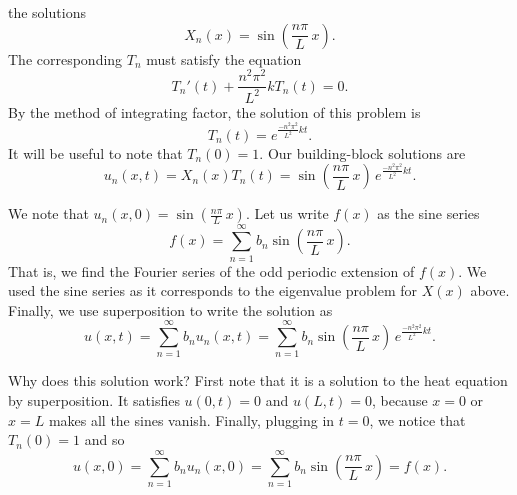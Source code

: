 the solutions
\begin{equation*}
X_n (x) = \sin \left(\frac{n \pi}{L} \, x \right) .
\end{equation*}
The corresponding $T_n$ must satisfy the equation
\begin{equation*}
T_n'(t) + \frac{n^2 \pi^2}{L^2} k T_n(t) = 0 .
\end{equation*}
By the method of integrating factor, the solution of this problem is
\begin{equation*}
T_n(t) = e^{\frac{-n^2 \pi^2}{L^2} k t} .
\end{equation*}
It will be useful to note that $T_n(0) = 1$.
Our building-block solutions are
\begin{equation*}
u_n(x,t) = X_n(x)T_n(t) =
\sin \left( \frac{n \pi}{L} \, x \right)
\, e^{\frac{-n^2 \pi^2}{L^2} k t} .
\end{equation*}

We note that $u_n(x,0) = \sin \left( \frac{n \pi}{L} \, x \right)$.  Let us
write $f(x)$ as the sine series
\begin{equation*}
f(x) = \sum_{n=1}^\infty b_n \sin \left(\frac{n \pi}{L} \, x \right) .
\end{equation*}
That is, we find the Fourier series of the odd periodic extension of $f(x)$.
We used the sine series as it corresponds to the eigenvalue problem for
$X(x)$ above.
Finally, we use superposition to write the solution as
\begin{equation*}
\boxed{~~
u(x,t) = 
\sum_{n=1}^\infty
b_n
u_n(x,t)
=
\sum_{n=1}^\infty
b_n
\sin \left( \frac{n \pi}{L} \, x \right)
\, e^{\frac{-n^2 \pi^2}{L^2} k t} .
~~}
\end{equation*}

Why does this solution work?  First note that it is a solution to
the heat equation by superposition.  It satisfies $u(0,t) = 0$
and $u(L,t) = 0$, because $x=0$ or $x=L$ makes all the sines vanish.
Finally, plugging in $t=0$, we notice that $T_n(0) = 1$ and so
\begin{equation*}
u(x,0) = 
\sum_{n=1}^\infty
b_n
u_n(x,0)
=
\sum_{n=1}^\infty
b_n
\sin \left( \frac{n \pi}{L} \, x \right)
=
f(x) .
\end{equation*}

